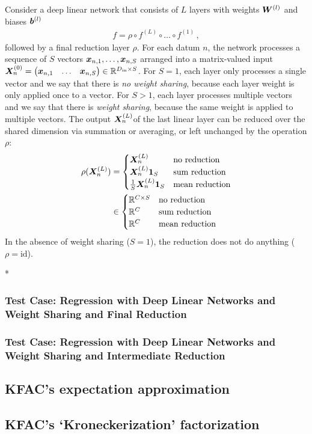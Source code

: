 \begin{setup}
  Consider a deep linear network that consists of $L$ layers with weights ${\bm{W}}^{(l)}$ and biases ${\bm{b}}^{(l)}$
  \begin{align*}
    f = \rho \circ f^{(L)} \circ \ldots \circ f^{(1)}\,,
  \end{align*}
  followed by a final reduction layer $\rho$. For each datum $n$, the network processes a sequence of $S$ vectors ${\bm{x}}_{n,1}, \dots, {\bm{x}}_{n,S}$ arranged into a matrix-valued input ${\bm{X}}^{(0)}_n = \begin{pmatrix} {\bm{x}}_{n,1} & \ldots & {\bm{x}}_{n,S} \end{pmatrix} \in {\mathbb{R}}^{D_{\text{in}} \times S}$.
  For $S=1$, each layer only processes a single vector and we say that there is \emph{no weight sharing}, because each layer weight is only applied once to a vector.
  For $S>1$, each layer processes multiple vectors and we say that there is \emph{weight sharing}, because the same weight is applied to multiple vectors.
  The output ${\bm{X}}^{(L)}_n$of the last linear layer can be reduced over the shared dimension via summation or averaging, or left unchanged by the operation $\rho$:
  \begin{align*}
    \rho({\bm{X}}_n^{(L)})
    &=
      \begin{cases}
        {\bm{X}}_n^{(L)} & \text{no reduction}
        \\
        {\bm{X}}_n^{(L)} {\bm{1}}_S & \text{sum reduction}
        \\
        \frac{1}{S} {\bm{X}}_n^{(L)} {\bm{1}}_S & \text{mean reduction}
      \end{cases}
    \\
    &\in
      \begin{cases}
        {\mathbb{R}}^{C \times S} & \text{no reduction}
        \\
        {\mathbb{R}}^C & \text{sum reduction}
        \\
        {\mathbb{R}}^C & \text{mean reduction}
      \end{cases}
  \end{align*}
  In the absence of weight sharing ($S = 1$), the reduction does not do anything ($\rho = \mathrm{id}$).
\end{setup}

\switchcolumn[1]*
\switchcolumn[0]
\subsubsection{Test Case: Regression with Deep Linear Networks and Weight Sharing and Final Reduction}

\subsubsection{Test Case: Regression with Deep Linear Networks and Weight Sharing and Intermediate Reduction}

\subsection{KFAC's expectation approximation}

\subsection{KFAC's `Kroneckerization' factorization}

